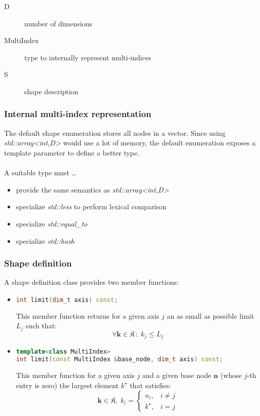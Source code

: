 \documentclass{article}
\begin{document}
\begin{description}
\item[D] number of dimensions
\item[MultiIndex] type to internally represent multi-indices
\item[S] shape description
\end{description}

\subsubsection{Internal multi-index representation}
The default shape enumeration stores all nodes in a vector. Since using \emph{std::array\textless int,D\textgreater} would use a lot of memory, the default enumeration exposes a template parameter to define a better type. \\ \\ A suitable type must \dots
\begin{itemize}
\item provide the same semantics as \emph{std::array\textless int,D\textgreater}
\item specialize \emph{std::less} to perform lexical comparison
\item specialize \emph{std::equal\_to}
\item specialize \emph{std::hash}
\end{itemize}

\subsubsection{Shape definition}
A shape definition class provides two member functions:

\begin{itemize}
\item
\begin{lstlisting}[language=C++, caption={}]
int limit(dim_t axis) const;
\end{lstlisting}
This member function returns for a given axis \( j \) an as small as possible limit \( L_j \) such that:
\[ \forall \boldsymbol{k} \in \mathfrak{K} \,\colon\; k_j \leq L_j \]

\item
\begin{lstlisting}[language=C++, caption={}]
template<class MultiIndex>
int limit(const MultiIndex &base_node, dim_t axis) const;
\end{lstlisting}
This member function for a given axis \( j \) and a given base node \( \boldsymbol{n} \) (whose \( j \)-th entry is zero)
the largest element \( k^\star \) that satisfies: 
\[ \boldsymbol{k} \in \mathfrak{K}, \;
k_i =
   \begin{cases}
      n_i,& i \neq j\\
      k^\star, & i = j
   \end{cases}
\]

\end{itemize}
\end{document}
